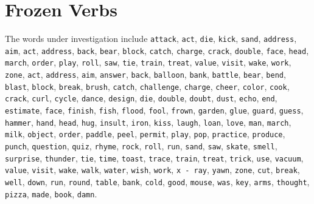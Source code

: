 \documentclass[a4paper,12pt,twoside,openright]{report}
\begin{document}
\section{Frozen Verbs}\label{section:frozen_verbs}
The words under investigation include
\Verb#attack#, \Verb#act#, \Verb#die#, \Verb#kick#, \Verb#sand#, \Verb#address#, \Verb#aim#, \Verb#act#, \Verb#address#, \Verb#back#, \Verb#bear#, \Verb#block#, \Verb#catch#, \Verb#charge#, \Verb#crack#, \Verb#double#, \Verb#face#, \Verb#head#, \Verb#march#, \Verb#order#, \Verb#play#, \Verb#roll#, \Verb#saw#, \Verb#tie#, \Verb#train#, \Verb#treat#, \Verb#value#, \Verb#visit#, \Verb#wake#, \Verb#work#, \Verb#zone#, \Verb#act#, \Verb#address#, \Verb#aim#, \Verb#answer#, \Verb#back#, \Verb#balloon#, \Verb#bank#, \Verb#battle#, \Verb#bear#, \Verb#bend#, \Verb#blast#, \Verb#block#, \Verb#break#, \Verb#brush#, \Verb#catch#, \Verb#challenge#, \Verb#charge#, \Verb#cheer#, \Verb#color#, \Verb#cook#, \Verb#crack#, \Verb#curl#, \Verb#cycle#, \Verb#dance#, \Verb#design#, \Verb#die#, \Verb#double#, \Verb#doubt#, \Verb#dust#, \Verb#echo#, \Verb#end#, \Verb#estimate#, \Verb#face#, \Verb#finish#, \Verb#fish#, \Verb#flood#, \Verb#fool#, \Verb#frown#, \Verb#garden#, \Verb#glue#, \Verb#guard#, \Verb#guess#, \Verb#hammer#, \Verb#hand#, \Verb#head#, \Verb#hug#, \Verb#insult#, \Verb#iron#, \Verb#kiss#, \Verb#laugh#, \Verb#loan#, \Verb#love#, \Verb#man#, \Verb#march#, \Verb#milk#, \Verb#object#, \Verb#order#, \Verb#paddle#, \Verb#peel#, \Verb#permit#, \Verb#play#, \Verb#pop#, \Verb#practice#, \Verb#produce#, \Verb#punch#, \Verb#question#, \Verb#quiz#, \Verb#rhyme#, \Verb#rock#, \Verb#roll#, \Verb#run#, \Verb#sand#, \Verb#saw#, \Verb#skate#, \Verb#smell#, \Verb#surprise#, \Verb#thunder#, \Verb#tie#, \Verb#time#, \Verb#toast#, \Verb#trace#, \Verb#train#, \Verb#treat#, \Verb#trick#, \Verb#use#, \Verb#vacuum#, \Verb#value#, \Verb#visit#, \Verb#wake#, \Verb#walk#, \Verb#water#, \Verb#wish#, \Verb#work#, \Verb#x - ray#, \Verb#yawn#, \Verb#zone#, \Verb#cut#, \Verb#break#, \Verb#well#, \Verb#down#, \Verb#run#, \Verb#round#, \Verb#table#, \Verb#bank#, \Verb#cold#, \Verb#good#, \Verb#mouse#, \Verb#was#, \Verb#key#, \Verb#arms#, \Verb#thought#, \Verb#pizza#, \Verb#made#, \Verb#book#, \Verb#damn#.
\end{document}

